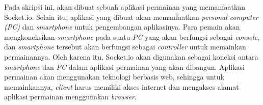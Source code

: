 Pada skripsi ini, akan dibuat sebuah aplikasi permainan yang memanfaatkan Socket.io. Selain itu, aplikasi yang dibuat akan memanfaatkan \textit{personal computer (PC)} dan \textit{smartphone} untuk pengembangan aplikasinya. Para pemain akan mengkoneksikan \textit{smartphone} pada suatu \textit{PC} yang akan berfungsi sebagai \textit{console}, dan \textit{smartphone} tersebut akan berfungsi sebagai \textit{controller} untuk memainkan permainannya. Oleh karena itu, Socket.io akan digunakan sebagai koneksi antara \textit{smartphone} dan \textit{PC} dalam aplikasi permainan yang akan dibangun. Aplikasi permainan akan menggunakan teknologi berbasis web, sehingga untuk memainkannya, \textit{client} harus memiliki akses internet dan mengakses alamat aplikasi permainan menggunakan \textit{browser}.





